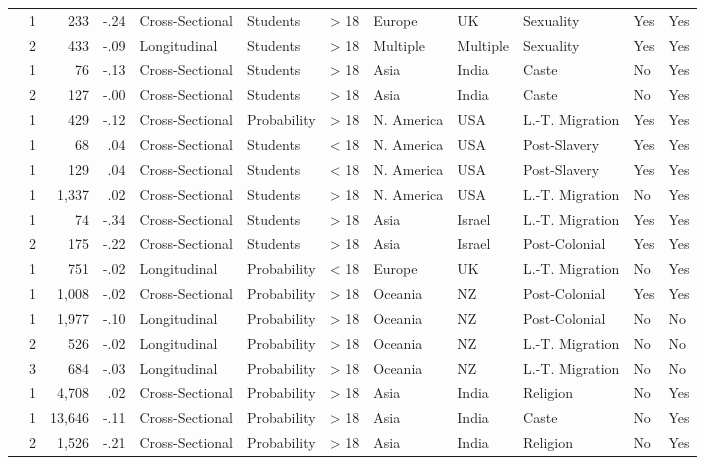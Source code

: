 \documentclass[10pt, letterpaper]{article}
\begin{document}
\begin{landscape}
\begin{xltabular}{650pt}{Xrrrllrlllll}
\cite{956} & 1 & 233 & -.24 & Cross-Sectional & Students & > 18 & Europe & UK & Sexuality & Yes & Yes\\
 & 2 & 433 & -.09 & Longitudinal & Students & > 18 & Multiple & Multiple & Sexuality & Yes & Yes\\
\cite{2380} & 1 & 76 & -.13 & Cross-Sectional & Students & > 18 & Asia & India & Caste & No & Yes\\
 & 2 & 127 & -.00 & Cross-Sectional & Students & > 18 & Asia & India & Caste & No & Yes\\
\cite{803} & 1 & 429 & -.12 & Cross-Sectional & Probability & > 18 & N. America & USA & L.-T. Migration & Yes & Yes\\
\cite{703} & 1 & 68 & .04 & Cross-Sectional & Students & < 18 & N. America & USA & Post-Slavery & Yes & Yes\\
\cite{244} & 1 & 129 & .04 & Cross-Sectional & Students & < 18 & N. America & USA & Post-Slavery & Yes & Yes\\
\cite{2333} & 1 & 1,337 & .02 & Cross-Sectional & Students & > 18 & N. America & USA & L.-T. Migration & No & Yes\\
\cite{4005} & 1 & 74 & -.34 & Cross-Sectional & Students & > 18 & Asia & Israel & L.-T. Migration & Yes & Yes\\
\cite{813} & 2 & 175 & -.22 & Cross-Sectional & Students & > 18 & Asia & Israel & Post-Colonial & Yes & Yes\\
\cite{2382} & 1 & 751 & -.02 & Longitudinal & Probability & < 18 & Europe & UK & L.-T. Migration & No & Yes\\
\cite{1695} & 1 & 1,008 & -.02 & Cross-Sectional & Probability & > 18 & Oceania & NZ & Post-Colonial & Yes & Yes\\
\cite{2381} & 1 & 1,977 & -.10 & Longitudinal & Probability & > 18 & Oceania & NZ & Post-Colonial & No & No\\
 & 2 & 526 & -.02 & Longitudinal & Probability & > 18 & Oceania & NZ & L.-T. Migration & No & No\\
 & 3 & 684 & -.03 & Longitudinal & Probability & > 18 & Oceania & NZ & L.-T. Migration & No & No\\
\cite{2385} & 1 & 4,708 & .02 & Cross-Sectional & Probability & > 18 & Asia & India & Religion & No & Yes\\
\cite{2392} & 1 & 13,646 & -.11 & Cross-Sectional & Probability & > 18 & Asia & India & Caste & No & Yes\\
 & 2 & 1,526 & -.21 & Cross-Sectional & Probability & > 18 & Asia & India & Religion & No & Yes\\

\end{xltabular}
\end{landscape}
\end{document}
